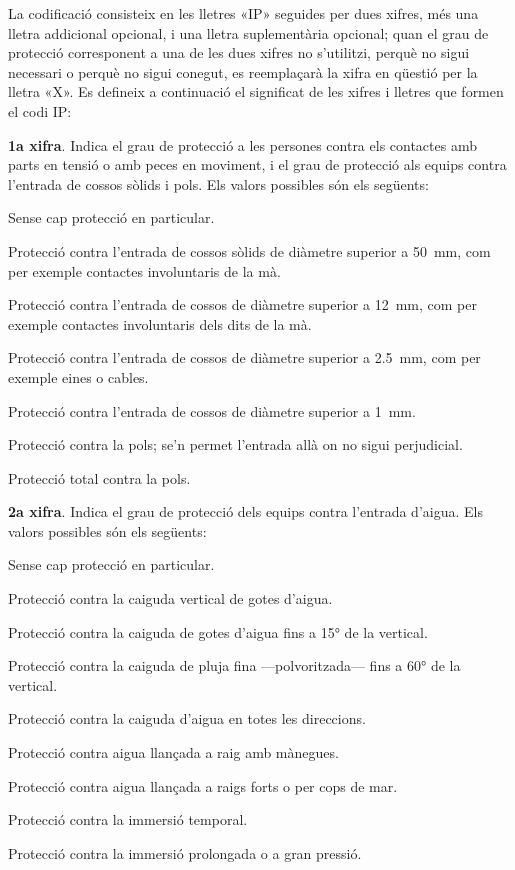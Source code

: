 La codificació consisteix en les lletres «IP»
seguides per dues xifres, més una lletra addicional opcional, i una
lletra suplementària opcional; quan el grau de protecció
corresponent a una de les dues xifres no s'utilitzi, perquè no sigui
necessari o perquè no sigui conegut, es reemplaçarà la xifra en
qüestió per la lletra «X». Es defineix a continuació el
significat de les xifres i lletres que formen el codi IP:

\textbf{1a xifra}. Indica el grau de protecció a les persones contra els contactes amb
parts en tensió o amb peces en moviment, i el grau de protecció als equips contra l'entrada de cossos sòlids i pols. Els valors possibles són els següents:
\begin{list}{}
	{\setlength{\labelwidth}{10mm} \setlength{\leftmargin}{15mm} \setlength{\labelsep}{5mm}}
	\item[0] Sense cap protecció en particular.
	\item[1]Protecció contra l'entrada de cossos sòlids de diàmetre superior a \qty{50}{mm},
	com per exemple   contactes involuntaris de la mà.
	\item[2] Protecció contra l'entrada de cossos de diàmetre superior a \qty{12}{mm}, com per exemple
	contactes involuntaris dels dits de la mà.
	\item[3] Protecció contra l'entrada de cossos de diàmetre superior a \qty{2,5}{mm},
	com per exemple eines o cables.
	\item[4] Protecció contra l'entrada de cossos de diàmetre superior a \qty{1}{mm}.
	\item[5] Protecció contra la pols; se'n permet l'entrada allà on no sigui perjudicial.
	\item[6] Protecció total contra la pols.
\end{list}

\textbf{2a xifra}. Indica el grau de protecció dels equips contra
l'entrada d'aigua. Els valors possibles són els següents:
\begin{list}{}
	{\setlength{\labelwidth}{10mm} \setlength{\leftmargin}{15mm} \setlength{\labelsep}{5mm}}
	\item[0] Sense cap protecció en particular.
	\item[1] Protecció contra la caiguda vertical de gotes d'aigua.
	\item[2] Protecció contra la caiguda de gotes d'aigua fins a \ang{15} de la  vertical.
	\item[3] Protecció contra la caiguda de pluja fina ---polvoritzada--- fins a \ang{60} de la  vertical.
	\item[4] Protecció contra la caiguda d'aigua en totes les direccions.
	\item[5] Protecció contra aigua llançada a raig amb mànegues.
	\item[6] Protecció contra aigua llançada a raigs forts o per cops de mar.
	\item[7] Protecció contra la immersió temporal.
	\item[8] Protecció contra la immersió prolongada o a gran pressió.
\end{list}


